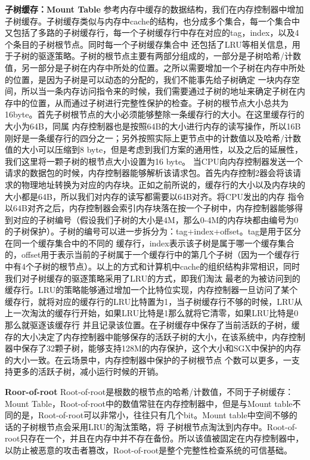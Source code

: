\textbf{子树缓存：Mount Table}
参考内存中缓存的数据结构，我们在内存控制器中增加子树缓存。子树缓存类似与内存中cache的结构，也分成多个集合，每一个集合中又包括了多路的子树缓存行，每一个子树缓存行中存在对应的tag，index，以及4个条目的子树根节点。同时每一个子树缓存集合中
还包括了LRU等相关信息，用于子树的驱逐策略。子树的根节点主要有两部分组成的，一部分是子树哈希/计数值，另一部分是子树在内存中所处的位置。之所以需要增加一个子树在内存中所处的位置，是因为子树是可以动态的分配的，我们不能事先给子树确定
一块内存空间，所以当一条内存访问指令来的时候，我们需要通过子树的地址来确定子树在内存中的位置，从而通过子树进行完整性保护的检查。子树的根节点大小总共为16byte。首先子树根节点的大小必须能够整除一条缓存行的大小。在这里缓存行的大小为64B，同属
内存控制器也是按照64B的大小进行内存的读写操作，所以16B刚好是一条缓存行的四分之一；另外按照实际上更节点中的计数值以及哈希/计数值的大小可以压缩到8 byte，但是考虑到我们方案的通用性，以及之后的延展性，我们这里将一颗子树的根节点大小设置为16 byte。
当CPU向内存控制器发送一个请求的数据包的时候，内存控制器能够解析该请求包。首先内存控制2器会将该请求的物理地址转换为对应的内存块。正如之前所说的，缓存行的大小以及内存块的大小都是64B，所以我们对内存的读写都需要以64B对齐。将CPU发出的内存
指令以64B对齐之后，内存控制器会索引内存块落在按一个子树中，内存控制器能够得到对应的子树编号（假设我们子树的大小是4M，那么0-4M的内存块都由编号为0的子树保护）。子树的编号可以进一步拆分为：tag+index+offset。tag是用于区分在同一个缓存集合中的不同的
缓存行，index表示该子树是属于哪一个缓存集合的，offset用于表示当前的子树属于一个缓存行中的第几个子树（因为一个缓存行中有4个子树的根节点）。以上的方式和计算机中cache的组织结构非常相识，同时我们对子树缓存的驱逐策略采用了LRU的方式，即我们淘汰
最老的为被访问到的缓存行。LRU的策略能够通过增加一个比特位实现，内存控制器一旦访问了某个缓存行，就将对应的缓存行的LRU比特置为1，当子树缓存行不够的时候，LRU从上一次淘汰的缓存行开始，如果LRU比特是1那么就将它清零，如果LRU比特是0那么就驱逐该缓存行
并且记录该位置。在子树缓存中保存了当前活跃的子树，缓存的大小决定了内存控制器中能够保存的活跃子树的大小，在该系统中，内存控制器中保存了32颗子树，能够支持128M的内存保护，这个大小和SGX中保护的内存的大小一致。在云场景中，内存控制器中保护的子树根节点
个数可以更多，一支持更多的活跃子树，减小运行时候的开销。

\textbf{Roor-of-root}
Root-of-root是根数的根节点的哈希/计数值，不同于子树缓存：Mount Table，Root-of-root中的数值常驻在内存控制器中，但是与Mount table不同的是，Root-of-root可以非常小，往往只有几个bit。Mount  table中空间不够的话的子树根节点会采用LRU的淘汰策略，将
子树根节点淘汰到内存中。Root-of-root只存在一个，并且在内存中并不存在备份。所以该值被固定在内存控制器中，以防止被恶意的攻击者篡改，Root-of-root是整个完整性检查系统的可信基础。

